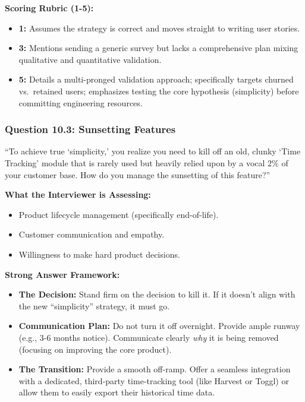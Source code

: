 \textbf{Scoring Rubric (1-5):}

\begin{itemize}
\tightlist
\item
  \textbf{1:} Assumes the strategy is correct and moves straight to
  writing user stories.
\item
  \textbf{3:} Mentions sending a generic survey but lacks a
  comprehensive plan mixing qualitative and quantitative validation.
\item
  \textbf{5:} Details a multi-pronged validation approach; specifically
  targets churned vs.~retained users; emphasizes testing the core
  hypothesis (simplicity) before committing engineering resources.
\end{itemize}

\subsubsection{Question 10.3: Sunsetting
Features}\label{question-10.3-sunsetting-features}

``To achieve true `simplicity,' you realize you need to kill off an old,
clunky `Time Tracking' module that is rarely used but heavily relied
upon by a vocal 2\% of your customer base. How do you manage the
sunsetting of this feature?''

\textbf{What the Interviewer is Assessing:}

\begin{itemize}
\tightlist
\item
  Product lifecycle management (specifically end-of-life).
\item
  Customer communication and empathy.
\item
  Willingness to make hard product decisions.
\end{itemize}

\textbf{Strong Answer Framework:}

\begin{itemize}
\tightlist
\item
  \textbf{The Decision:} Stand firm on the decision to kill it. If it
  doesn't align with the new ``simplicity'' strategy, it must go.
\item
  \textbf{Communication Plan:} Do not turn it off overnight. Provide
  ample runway (e.g., 3-6 months notice). Communicate clearly \emph{why}
  it is being removed (focusing on improving the core product).
\item
  \textbf{The Transition:} Provide a smooth off-ramp. Offer a seamless
  integration with a dedicated, third-party time-tracking tool (like
  Harvest or Toggl) or allow them to easily export their historical time
  data.
\end{itemize}

